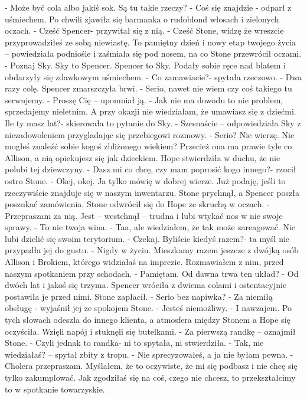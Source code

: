 \documentclass[12pt,a4paper]{book}
\begin{document}
- Może być cola albo jakiś sok. Są tu takie rzeczy? 
- Coś się znajdzie - odparł z uśmiechem. 
Po chwili zjawiła się barmanka o rudoblond włosach i zielonych oczach. 
- Cześć Spencer- przywitał się z nią. 
- Cześć Stone, widzę że wreszcie przyprowadziłeś ze sobą niewiastę. To pamiętny dzień i nowy etap twojego życia – powiedziała podniośle i zaśmiała się pod nosem, na co Stone przewrócił oczami. 
- Poznaj Sky. Sky to Spencer. Spencer to Sky. 
Podały sobie ręce nad blatem i obdarzyły się zdawkowym uśmiechem.
- Co zamawiacie?- spytała rzeczowo. 
- Dwa razy colę. 
Spencer zmarszczyła brwi.
- Serio, nawet nie wiem czy coś takiego tu serwujemy. 
- Proszę Cię – upomniał ją. 
- Jak nie ma dowodu to nie problem, sprzedajemy nieletnim. A przy okazji nie wiedziałam, że umawiasz się z dziećmi. Ile ty masz lat?- skierowała to pytanie do Sky.
- Szesnaście – odpowiedziała Sky z niezadowoleniem przygladając się przebiegowi rozmowy. 
- Serio? Nie wierzę. Nie mogłeś znaleźć sobie kogoś zbliżonego wiekiem? Przecież ona ma prawie tyle co Allison, a nią opiekujesz się jak dzieckiem. 
Hope stwierdziła w duchu, że nie polubi tej dziewczyny. 
- Dasz mi co chcę, czy mam poprosić kogo innego?- rzucił ostro Stone. 
- Okej, okej. Ja tylko mówię w dobrej wierze. Już podaję, jeśli to rzeczywiście znajduje się w naszym inwentarzu. 
Stone prychnął, a Spencer poszła poszukać zamówienia. Stone odwrócił się do Hope ze skruchą w oczach. 
- Przepraszam za nią. Jest – westchnął – trudna i lubi wtykać nos w nie swoje sprawy. 
- To nie twoja wina.
- Taa, ale wiedziałem, że tak może zareagować. Nie lubi dzielić się swoim terytorium. 
- Czekaj. Byliście kiedyś razem?- ta myśl nie przypadła jej do gustu.
- Nigdy w życiu. Mieszkamy razem jeszcze z dwójką osób Allison i Brokiem, którego widziałaś na imprezie. Rozmawiałem z nim, przed naszym spotkaniem przy schodach. 
- Pamiętam. Od dawna trwa ten układ?
- Od dwóch lat i jakoś się trzyma. 
Spencer wróciła z dwiema colami i ostentacyjnie postawiła je przed nimi. Stone zapłacił. 
- Serio bez napiwka?
- Za niemiłą obsługę - wyjaśnił jej ze spokojem Stone. 
- Jesteś niemożliwy.
- I nawzajem. 
Po tych słowach odeszła do innego klienta, a atmosfera między Stonem a Hope się oczyściła. Wzięli napój i stuknęli się butelkami. 
- Za pierwszą randkę – oznajmił Stone. 
- Czyli jednak to randka- ni to spytała, ni stwierdziła.
- Tak, nie wiedziałaś? – spytał zbity z tropu. 
- Nie sprecyzowałeś, a ja nie byłam pewna.
- Cholera przepraszam. Myślałem, że to oczywiste, że mi się podbasz i nie chcę się tylko zakumplować. Jak zgodziłaś się na coś, czego nie chcesz, to przekształcimy to w spotkanie towarzyskie. 
\end{document}
